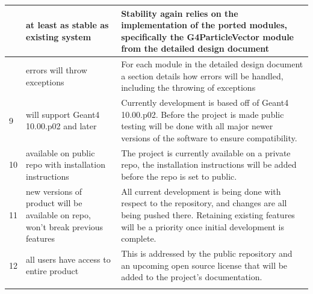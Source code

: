 \documentclass[12pt]{article}
\newcommand{\todo}[1]{\textcolor{red}{[TODO: #1]}} \else
\newcommand{\authornote}[3]{} \newcommand{\todo}[1]{} \fi
\newcommand{\mmp}[1]{\authornote{green}{MP}{#1}}
\begin{document}
\begin{center}
\begin{longtable}{>{\raggedright\arraybackslash}p{}>{\raggedright\arraybackslash}p{}>{\raggedright\arraybackslash}p{}}
7 & at least as stable as existing system & Stability again relies on the implementation of the ported modules, specifically the G4ParticleVector module from the detailed design document\\\hline

8 & errors will throw exceptions & For each module in the detailed design document a section details how errors will be handled, including the throwing of exceptions\\\hline

9 & will support Geant4 10.00.p02 and later & Currently development is based off of Geant4 10.00.p02. Before the project is made public testing will be done with all major newer versions of the software to ensure compatibility.\\\hline

10 & available on public repo with installation instructions & The project is currently available on a private repo, the installation instructions will be added before the repo is set to public.\\\hline

11 & new versions of product will be available on repo, won't break previous features & All current development is being done with respect to the repository, and changes are all being pushed there. Retaining existing features will be a priority once initial development is complete.\\\hline

12 & all users have access to entire product & This is addressed by the public repository and an upcoming open source license that will be added to the project's documentation.\\

\arrayrulecolor{black}
\bottomrule
\end{longtable}
\end{center}
\mmp{Removed hardware detection requirement -- see SRS comment for reasoning}
\end{document}
